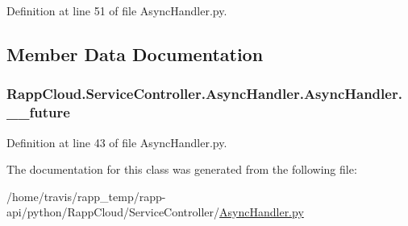 Definition at line 51 of file Async\-Handler.\-py.



\subsection{Member Data Documentation}
\hypertarget{classRappCloud_1_1ServiceController_1_1AsyncHandler_1_1AsyncHandler_ac08a48bf10a7a98a98d85d65dd2cf1a9}{
\subsubsection[{\-\_\-\-\_\-future}]{\setlength{\rightskip}{0pt plus 5cm}Rapp\-Cloud.\-Service\-Controller.\-Async\-Handler.\-Async\-Handler.\-\_\-\-\_\-future\hspace{0.3cm}{\ttfamily [private]}}}\label{classRappCloud_1_1ServiceController_1_1AsyncHandler_1_1AsyncHandler_ac08a48bf10a7a98a98d85d65dd2cf1a9}


Definition at line 43 of file Async\-Handler.\-py.



The documentation for this class was generated from the following file\-:\begin{DoxyCompactItemize}
\item 
/home/travis/rapp\-\_\-temp/rapp-\/api/python/\-Rapp\-Cloud/\-Service\-Controller/\hyperlink{AsyncHandler_8py}{Async\-Handler.\-py}\end{DoxyCompactItemize}
